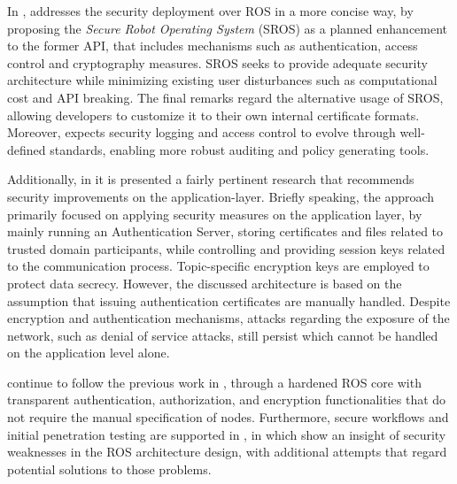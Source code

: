 
In , \citeauthor{white2016sros} addresses the security deployment over ROS in a more concise way, by proposing the \textit{Secure Robot Operating System} (SROS) as a planned enhancement to the former API, that includes mechanisms such as authentication, access control and cryptography measures. SROS seeks to provide adequate security architecture while minimizing existing user disturbances such as computational cost and API breaking. The final remarks regard the alternative usage of SROS, allowing developers to customize it to their own internal certificate formats. Moreover, \citeauthor{white2016sros} expects security logging and access control to evolve through well-defined standards, enabling more robust auditing and policy generating tools. 

Additionally, in  it is presented a fairly pertinent research that recommends security improvements on the application-layer. Briefly speaking, the approach primarily focused on applying security measures on the application layer, by mainly running an Authentication Server, storing certificates and files related to trusted domain participants, while controlling and providing session keys related to the communication process. Topic-specific encryption keys are employed to protect data secrecy. However, the discussed architecture is based on the assumption that issuing authentication certificates are manually handled. Despite encryption and authentication mechanisms, attacks regarding the exposure of the network, such as denial of service attacks, still persist which cannot be handled on the application level alone. 

\citeauthor*{breiling2017secure} continue to follow the previous work in , through a hardened ROS core with transparent authentication, authorization, and encryption functionalities that do not require the manual specification of nodes. Furthermore, secure workflows and initial penetration testing are supported in , in which \citeauthor{dieber2017security} show an insight of security weaknesses in the ROS architecture design, with additional attempts that regard potential solutions to those problems.

